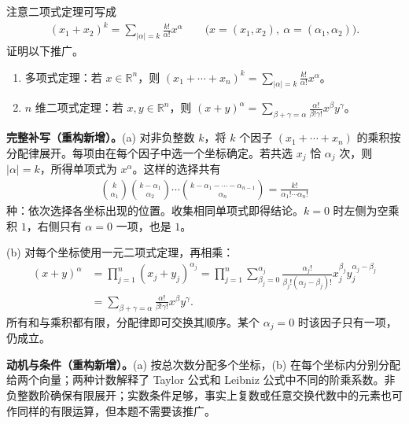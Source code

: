 \documentclass[../../main.tex]{subfiles}
\begin{document}
\begin{exercise}\label{exercise:ch08-multinomial}
注意二项式定理可写成
\begin{align*}
(x_1+x_2)^k=\sum_{|\alpha|=k}\frac{k!}{\alpha!}x^\alpha
\qquad\bigl(x=(x_1,x_2),\ \alpha=(\alpha_1,\alpha_2)\bigr).
\end{align*}
证明以下推广。
\begin{enumerate}
\item\label{item:ch08-multinomial-a}多项式定理：若 $x\in\mathbb R^n$，则
$\displaystyle (x_1+\cdots+x_n)^k=\sum_{|\alpha|=k}\frac{k!}{\alpha!}x^\alpha$。
\item\label{item:ch08-multinomial-b}$n$ 维二项式定理：若 $x,y\in\mathbb R^n$，则
$\displaystyle (x+y)^\alpha=\sum_{\beta+\gamma=\alpha}\frac{\alpha!}{\beta!\gamma!}x^\beta y^\gamma$。
\end{enumerate}
\end{exercise}
\begin{solution}
\textbf{完整补写（重构新增）。}(a) 对非负整数 $k$，将 $k$ 个因子 $(x_1+\cdots+x_n)$ 的乘积按分配律展开。每项由在每个因子中选一个坐标确定。若共选 $x_j$ 恰 $\alpha_j$ 次，则 $|\alpha|=k$，所得单项式为 $x^\alpha$。这样的选择共有
\begin{align*}
\binom{k}{\alpha_1}\binom{k-\alpha_1}{\alpha_2}\cdots
\binom{k-\alpha_1-\cdots-\alpha_{n-1}}{\alpha_n}
=\frac{k!}{\alpha_1!\cdots\alpha_n!}
\end{align*}
种：依次选择各坐标出现的位置。收集相同单项式即得结论。$k=0$ 时左侧为空乘积 $1$，右侧只有 $\alpha=0$ 一项，也是 $1$。

(b) 对每个坐标使用一元二项式定理，再相乘：
\begin{align*}
(x+y)^\alpha
&=\prod_{j=1}^n(x_j+y_j)^{\alpha_j}
=\prod_{j=1}^n\sum_{\beta_j=0}^{\alpha_j}
\frac{\alpha_j!}{\beta_j!(\alpha_j-\beta_j)!}
 x_j^{\beta_j}y_j^{\alpha_j-\beta_j}\\
&=\sum_{\beta+\gamma=\alpha}
\frac{\alpha!}{\beta!\gamma!}x^\beta y^\gamma.
\end{align*}
所有和与乘积都有限，分配律即可交换其顺序。某个 $\alpha_j=0$ 时该因子只有一项，仍成立。
\end{solution}
\begin{remark}
\textbf{动机与条件（重构新增）。}(a) 按总次数分配多个坐标，(b) 在每个坐标内分别分配给两个向量；两种计数解释了 Taylor 公式和 Leibniz 公式中不同的阶乘系数。非负整数阶确保有限展开；实数条件足够，事实上复数或任意交换代数中的元素也可作同样的有限运算，但本题不需要该推广。
\end{remark}
\end{document}
